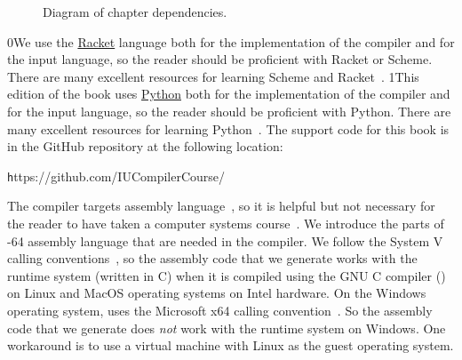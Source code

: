 \documentclass[7x10]{TimesAPriori_MIT}%
\def\racketEd{0}
\def\pythonEd{1}
\def\edition{1}
\newcommand{\racket}[1]{{\if\edition\racketEd{#1}\fi}}
\newcommand{\pythonColor}[0]{}
\newcommand{\python}[1]{{\if\edition\pythonEd\pythonColor #1\fi}}
\numberwithin{theorem}{chapter}
\numberwithin{definition}{chapter}
\numberwithin{equation}{chapter}
\begin{document}
\begin{figure}[tp]
\begin{tcolorbox}[colback=white]
{
\fi}
\end{tcolorbox}
\caption{Diagram of chapter dependencies.}
\label{fig:chapter-dependences}
\end{figure}

\racket{We use the \href{https://racket-lang.org/}{Racket} language both for
the implementation of the compiler and for the input language, so the
reader should be proficient with Racket or Scheme. There are many
excellent resources for learning Scheme and
Racket~\citep{Dybvig:1987aa,Abelson:1996uq,Friedman:1996aa,Felleisen:2001aa,Felleisen:2013aa,Flatt:2014aa}.}
%
\python{This edition of the book uses \href{https://www.python.org/}{Python}
both for the implementation of the compiler and for the input language, so the
reader should be proficient with Python. There are many
excellent resources for learning Python~\citep{Lutz:2013vp,Barry:2016vj,Sweigart:2019vn,Matthes:2019vs}.}%
%
The support code for this book is in the GitHub repository at
the following location:
\begin{center}\small\texttt
  https://github.com/IUCompilerCourse/
\end{center}

The compiler targets {\ArchName} assembly language~\citep{Intel:2015aa}, so it
is helpful but not necessary for the reader to have taken a computer
systems course~\citep{Bryant:2010aa}. We introduce the parts of {\ArchName}-64
assembly language that are needed in the compiler.
%
We follow the System V calling
conventions~\citep{Bryant:2005aa,Matz:2013aa}, so the assembly code
that we generate works with the runtime system (written in C) when it
is compiled using the GNU C compiler () on Linux and MacOS
operating systems on Intel hardware.
%
On the Windows operating system,  uses the Microsoft x64
calling convention~\citep{Microsoft:2018aa,Microsoft:2020aa}. So the
assembly code that we generate does \emph{not} work with the runtime
system on Windows. One workaround is to use a virtual machine with
Linux as the guest operating system.
\end{document}
